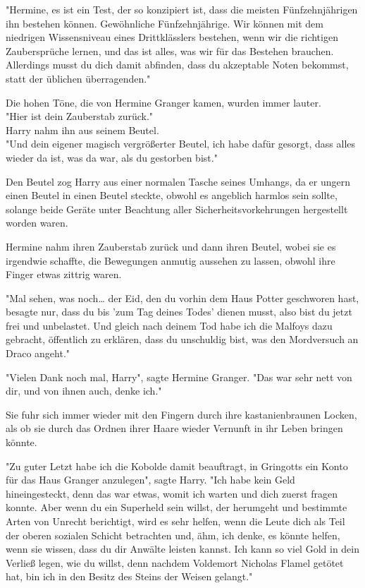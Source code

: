 {"Hermine, es ist ein Test, der so konzipiert ist, dass die meisten Fünfzehnjährigen ihn bestehen können. Gewöhnliche Fünfzehnjährige. Wir können mit dem niedrigen Wissensniveau eines Drittklässlers bestehen, wenn wir die richtigen Zaubersprüche lernen, und das ist alles, was wir für das Bestehen brauchen. Allerdings musst du dich damit abfinden, dass du akzeptable Noten bekommst, statt der üblichen überragenden."

Die hohen Töne, die von Hermine Granger kamen, wurden immer lauter.\\ "Hier ist dein Zauberstab zurück."\\ Harry nahm ihn aus seinem Beutel.\\ "Und dein eigener magisch vergrößerter Beutel, ich habe dafür gesorgt, dass alles wieder da ist, was da war, als du gestorben bist."

Den Beutel zog Harry aus einer normalen Tasche seines Umhangs, da er ungern einen Beutel in einen Beutel steckte, obwohl es angeblich harmlos sein sollte, solange beide Geräte unter Beachtung aller Sicherheitsvorkehrungen hergestellt worden waren.

Hermine nahm ihren Zauberstab zurück und dann ihren Beutel, wobei sie es irgendwie schaffte, die Bewegungen anmutig aussehen zu lassen, obwohl ihre Finger etwas zittrig waren.

"Mal sehen, was noch… der Eid, den du vorhin dem Haus Potter geschworen hast, besagte nur, dass du bis 'zum Tag deines Todes' dienen musst, also bist du jetzt frei und unbelastet. Und gleich nach deinem Tod habe ich die Malfoys dazu gebracht, öffentlich zu erklären, dass du unschuldig bist, was den Mordversuch an Draco angeht."

"Vielen Dank noch mal, Harry", sagte Hermine Granger. "Das war sehr nett von dir, und von ihnen auch, denke ich."

Sie fuhr sich immer wieder mit den Fingern durch ihre kastanienbraunen Locken, als ob sie durch das Ordnen ihrer Haare wieder Vernunft in ihr Leben bringen könnte.

"Zu guter Letzt habe ich die Kobolde damit beauftragt, in Gringotts ein Konto für das Haus Granger anzulegen", sagte Harry. "Ich habe kein Geld hineingesteckt, denn das war etwas, womit ich warten und dich zuerst fragen konnte. Aber wenn du ein Superheld sein willst, der herumgeht und bestimmte Arten von Unrecht berichtigt, wird es sehr helfen, wenn die Leute dich als Teil der oberen sozialen Schicht betrachten und, ähm, ich denke, es könnte helfen, wenn sie wissen, dass du dir Anwälte leisten kannst. Ich kann so viel Gold in dein Verließ legen, wie du willst, denn nachdem Voldemort Nicholas Flamel getötet hat, bin ich in den Besitz des Steins der Weisen gelangt."

}
